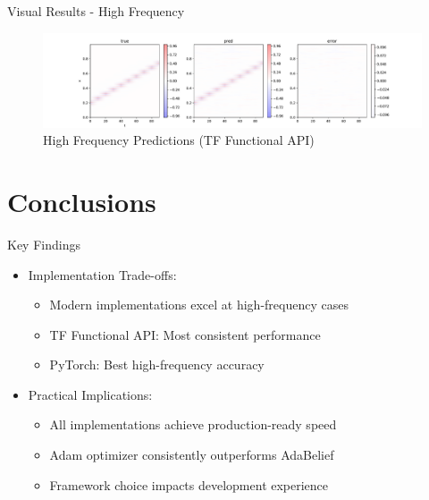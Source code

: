 \documentclass{beamer}
\begin{document}
\begin{frame}{Visual Results - High Frequency}
    \begin{figure}
        \includegraphics[width=\textwidth]{../../results/functional/high-frequency-adam-20250206-1520-1/vis}
        \caption{High Frequency Predictions (TF Functional API)}
    \end{figure}
\end{frame}

\section{Conclusions}
\begin{frame}{Key Findings}
    \begin{itemize}
        \item Implementation Trade-offs:
        \begin{itemize}
            \item Modern implementations excel at high-frequency cases
            \item TF Functional API: Most consistent performance
            \item PyTorch: Best high-frequency accuracy
        \end{itemize}
        \item Practical Implications:
        \begin{itemize}
            \item All implementations achieve production-ready speed
            \item Adam optimizer consistently outperforms AdaBelief
            \item Framework choice impacts development experience
        \end{itemize}
    \end{itemize}
\end{frame}
\end{document}
